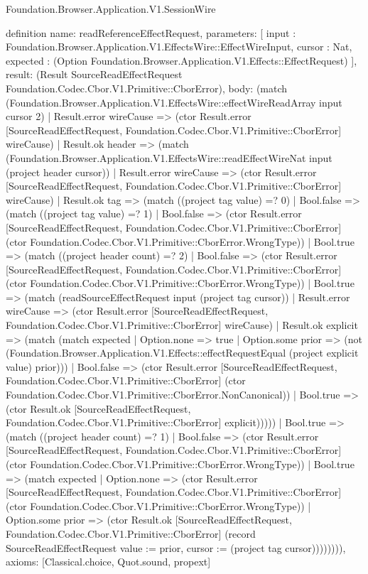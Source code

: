 \begin{lexlean}{Foundation.Browser.Application.V1.SessionWire}
\begin{semanticmodule}
definition{
  name: readReferenceEffectRequest,
  parameters: [
    input : Foundation.Browser.Application.V1.EffectsWire::EffectWireInput,
    cursor : Nat,
    expected : (Option Foundation.Browser.Application.V1.Effects::EffectRequest)
  ],
  result: (Result SourceReadEffectRequest Foundation.Codec.Cbor.V1.Primitive::CborError),
  body: (match (Foundation.Browser.Application.V1.EffectsWire::effectWireReadArray input cursor 2)
    | Result.error wireCause => (ctor Result.error [SourceReadEffectRequest, Foundation.Codec.Cbor.V1.Primitive::CborError] wireCause)
    | Result.ok header => (match (Foundation.Browser.Application.V1.EffectsWire::readEffectWireNat input (project header cursor))
      | Result.error wireCause => (ctor Result.error [SourceReadEffectRequest, Foundation.Codec.Cbor.V1.Primitive::CborError] wireCause)
      | Result.ok tag => (match ((project tag value) =? 0)
        | Bool.false => (match ((project tag value) =? 1)
          | Bool.false => (ctor Result.error [SourceReadEffectRequest, Foundation.Codec.Cbor.V1.Primitive::CborError] (ctor Foundation.Codec.Cbor.V1.Primitive::CborError.WrongType))
          | Bool.true => (match ((project header count) =? 2)
            | Bool.false => (ctor Result.error [SourceReadEffectRequest, Foundation.Codec.Cbor.V1.Primitive::CborError] (ctor Foundation.Codec.Cbor.V1.Primitive::CborError.WrongType))
            | Bool.true => (match (readSourceEffectRequest input (project tag cursor))
              | Result.error wireCause => (ctor Result.error [SourceReadEffectRequest, Foundation.Codec.Cbor.V1.Primitive::CborError] wireCause)
              | Result.ok explicit => (match (match expected
                  | Option.none => true
                  | Option.some prior => (not (Foundation.Browser.Application.V1.Effects::effectRequestEqual (project explicit value) prior)))
                | Bool.false => (ctor Result.error [SourceReadEffectRequest, Foundation.Codec.Cbor.V1.Primitive::CborError] (ctor Foundation.Codec.Cbor.V1.Primitive::CborError.NonCanonical))
                | Bool.true => (ctor Result.ok [SourceReadEffectRequest, Foundation.Codec.Cbor.V1.Primitive::CborError] explicit)))))
        | Bool.true => (match ((project header count) =? 1)
          | Bool.false => (ctor Result.error [SourceReadEffectRequest, Foundation.Codec.Cbor.V1.Primitive::CborError] (ctor Foundation.Codec.Cbor.V1.Primitive::CborError.WrongType))
          | Bool.true => (match expected
            | Option.none => (ctor Result.error [SourceReadEffectRequest, Foundation.Codec.Cbor.V1.Primitive::CborError] (ctor Foundation.Codec.Cbor.V1.Primitive::CborError.WrongType))
            | Option.some prior => (ctor Result.ok [SourceReadEffectRequest, Foundation.Codec.Cbor.V1.Primitive::CborError] (record SourceReadEffectRequest {value := prior, cursor := (project tag cursor)}))))))),
  axioms: [Classical.choice, Quot.sound, propext]
}


\end{semanticmodule}
\end{lexlean}
